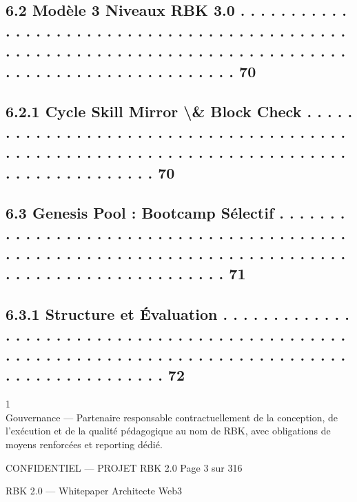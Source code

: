 \documentclass[12pt,landscape,a4paper]{article}
\newenvironment{confidential}
{\begin{tcolorbox}[
    colback=rbkred!5!white,
    colframe=rbkred!75!black,
    title=CONFIDENTIEL,
    fonttitle=\bfseries\color{white},
    coltitle=rbkred!75!black,
    breakable,
    enhanced,
    frame hidden,
    borderline west={2pt}{0pt}{rbkred!75!black}
]}
{\end{tcolorbox}}
\begin{document}
\subsection{6.2     Modèle 3 Niveaux RBK 3.0 . . . . . . . . . . . . . . . . . . . . . . . . . . . . . . . . . . . . . . . . . . . . . . . . . . . . . . . . . . . . . . . . . . . . . . . . . . . . . . . . . . . . . . . . . . . . . . . . . . . . . . 70}
\subsection{6.2.1              Cycle Skill Mirror \textbackslash{}& Block Check . . . . . . . . . . . . . . . . . . . . . . . . . . . . . . . . . . . . . . . . . . . . . . . . . . . . . . . . . . . . . . . . . . . . . . . . . . . . . . . . . . . . . . . . 70}
\subsection{6.3     Genesis Pool : Bootcamp Sélectif . . . . . . . . . . . . . . . . . . . . . . . . . . . . . . . . . . . . . . . . . . . . . . . . . . . . . . . . . . . . . . . . . . . . . . . . . . . . . . . . . . . . . . . . . . . . . . . . . 71}
\subsection{6.3.1              Structure et Évaluation . . . . . . . . . . . . . . . . . . . . . . . . . . . . . . . . . . . . . . . . . . . . . . . . . . . . . . . . . . . . . . . . . . . . . . . . . . . . . . . . . . . . . . . . . . . . . . . . . 72}
1\\
Gouvernance — Partenaire responsable contractuellement de la conception, de l’exécution et de la qualité pédagogique au nom de RBK, avec obligations de\\
moyens renforcées et reporting dédié.\\
\vspace{0.5em}
\vspace{0.5em}
\vspace{0.5em}
\vspace{0.5em}
\begin{confidential}CONFIDENTIEL — PROJET RBK 2.0                                                                               Page 3 sur 316\end{confidential}
RBK 2.0 — Whitepaper Architecte Web3\\
\vspace{0.5em}
\vspace{0.5em}
\end{document}
